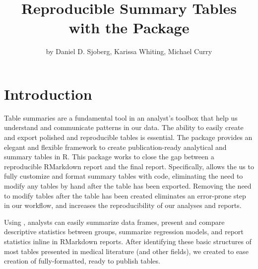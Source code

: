 \title{Reproducible Summary Tables with the  Package}
\author{by Daniel D. Sjoberg, Karissa Whiting, Michael Curry}

\maketitle



\section{Introduction}

Table summaries are a fundamental tool in an analyst's toolbox that help us understand and communicate patterns in our data.
The ability to easily create and export polished and reproducible tables is essential.
The  \citep{gtsummary} package provides an elegant and flexible framework to create publication-ready analytical and summary tables in R.
This package works to close the gap between a reproducible RMarkdown report and the final report.
Specifically,  allows the us to fully customize and format summary tables with code, eliminating the need to modify any tables by hand after the table has been exported.
Removing the need to modify tables after the table has been created eliminates an error-prone step in our workflow, and increases the reproducibility of our analyses and reports. 

Using , analysts can easily summarize data frames, present and compare descriptive statistics between groups, summarize regression models, and report statistics inline in RMarkdown reports. 
After identifying these basic structures of most tables presented in medical literature (and other fields), we created  to ease creation of fully-formatted, ready to publish tables.

